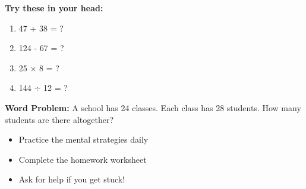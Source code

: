 \documentclass[a4paper,11pt]{article}
\begin{document}
\textbf{Try these in your head:}
\begin{enumerate}
    \item 47 + 38 = ?
    \item 124 - 67 = ?
    \item 25 × 8 = ?
    \item 144 ÷ 12 = ?
\end{enumerate}

\textbf{Word Problem:}
A school has 24 classes. Each class has 28 students. How many students are there altogether?

\vspace{1cm}

\begin{tcolorbox}[colback=gray!10!white,colframe=gray!50!black,title=\textbf{Homework Reminder}]
\begin{itemize}
    \item Practice the mental strategies daily
    \item Complete the homework worksheet
    \item Ask for help if you get stuck!
\end{itemize}
\end{tcolorbox}
\end{document}
